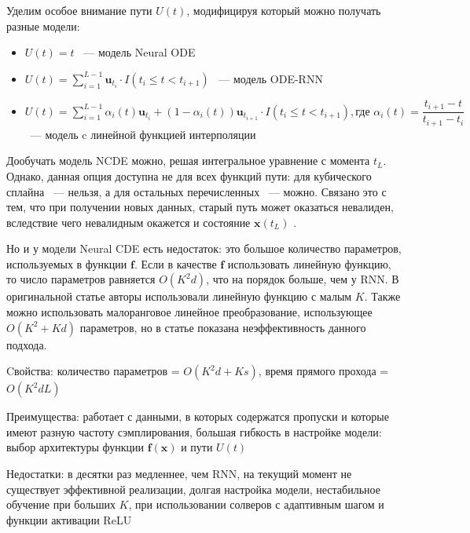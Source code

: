\documentclass[a4paper, 12pt]{article}
\newcommand{\bx}{\mathbf{x}}
\newcommand{\bff}{\mathbf{f}}
\newcommand{\bu}{\mathbf{u}}
\begin{document}
	Уделим особое внимание пути $U(t)$, модифицируя который можно получать разные модели:
	\begin{itemize}
		\item $U(t) = t$ ~--- модель Neural ODE \citep{node}
		\item $U(t) = \sum\limits_{i=1}^{L-1} \bu_{t_i} \cdot I(t_i \leqslant t < t_{i+1})$ ~--- модель ODE-RNN \citep{latent-ode}
		\item $U(t) = \sum\limits_{i=1}^{L-1} \alpha_i(t) \bu_{t_i} + (1-\alpha_i(t)) \bu_{t_{i+1}} \cdot I(t_i \leqslant t < t_{i+1}), \text{где } \alpha_i(t) = \dfrac{t_{i+1} - t}{t_{i+1} - t_i}$ ~--- модель c линейной функцией интерполяции
	\end{itemize}

	Дообучать модель NCDE можно, решая интегральное уравнение с момента $t_{L}$.
	Однако, данная опция доступна не для всех функций пути: для кубического сплайна ~--- нельзя, а для остальных перечисленных ~--- можно.
	Связано это с тем, что при получении новых данных, старый путь может оказаться невалиден, вследствие чего невалидным окажется и состояние $\bx(t_L)$ \citep{ncde-online}. 
	
	Но и у модели Neural CDE есть недостаток: это большое количество параметров, используемых в функции $\bff$.
	Если в качестве $\bff$ использовать линейную функцию, то число параметров равняется $O(K^2d)$, что на порядок больше, чем у RNN.
	В оригинальной статье \citep{ncde} авторы использовали линейную функцию с малым $K$.
	Также можно использовать малоранговое линейное преобразование, использующее $O(K^2 + Kd)$ параметров, но в статье \citep{ncde} показана неэффективность данного подхода.
	
	Cвойства: количество параметров = $O(K^2d + Ks)$, время прямого прохода = $O(K^2dL)$
	
	Преимущества: работает с данными, в которых содержатся пропуски и которые имеют разную частоту сэмплирования, большая гибкость в настройке модели: выбор архитектуры функции $\bff(\bx)$ и пути $U(t)$
	
	Недостатки: в десятки раз медленнее, чем RNN, на текущий момент не существует эффективной реализации, долгая настройка модели, нестабильное обучение при больших $K$, при использовании солверов с адаптивным шагом и функции активации ReLU
\end{document}
